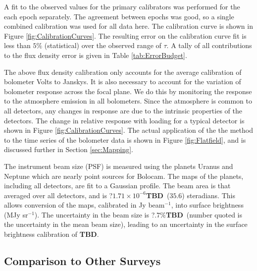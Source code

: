 \documentclass[12pt,preprint]{aastex}
\newcommand{\Check}{{\bf ???}}
\newcommand{\bcamfwhm}{31.2\arcsec}
\newcommand{\TBD}{{\bf TBD}}
\begin{document}
A fit to the observed values for the primary calibrators was performed
for the each epoch separately.
The agreement between epochs was good, so a single combined
calibration was used for all data here.
The calibration curve is shown in Figure \ref{fig:CalibrationCurves}.  The
resulting error on the calibration curve fit is less than 
$5\%$ (statistical) over the observed range of $\tau$.  A tally of all
contributions to the flux density error is given in Table
\ref{tab:ErrorBudget}.

The above flux density calibration only accounts for the average
calibration of bolometer Volts to Janskys.  It is also necessary to
account for the variation of bolometer response across the focal
plane.  We do this by monitoring the response to the atmosphere
emission in all bolometers.  Since the atmosphere is common to all
detectors, any changes in response are due to the intrinsic properties
of the detectors.  The change in relative response with loading for a
typical detector is shown in Figure \ref{fig:CalibrationCurves}.  The
actual application of the the method to the time series of the
bolometer data is shown in Figure \ref{fig:Flatfield}, and is
discussed further in Section \ref{sec:Mapping}.

The instrument beam size (PSF) is measured using the planets Uranus
and Neptune which are nearly point sources for Bolocam.
The maps of the planets, including all detectors, are fit to a
Gaussian profile.  The beam area is that averaged over all detectors,
and is ?$1.71\times10^{-6}$\TBD\ ($35.6$\farcs) steradians.  This
allows conversion of the maps, calibrated in Jy beam$^{-1}$, into
surface brightness (MJy sr$^{-1}$).  The uncertainty in the beam size
is ?$.7\%$\TBD\ (number quoted is the uncertainty in the mean beam
size), leading to an uncertainty in the surface brightness calibration
of \TBD.

\subsection{Comparison to Other Surveys}
\end{document}
